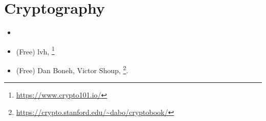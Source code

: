 \section{Cryptography}

\begin{itemize}
\item \Schneier{}

\item (Free) lvh, \footnote{\AlsoAvailableAs \url{https://www.crypto101.io/}}

\item (Free) Dan Boneh, Victor Shoup, \footnote{\AlsoAvailableAs \url{https://crypto.stanford.edu/~dabo/cryptobook/}}.
\end{itemize}

